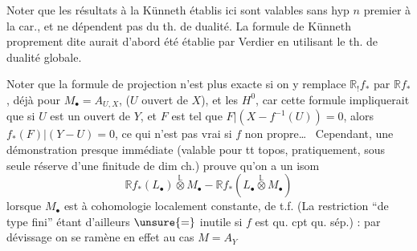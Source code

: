 Noter que les résultats à la Künneth établis ici
sont valables sans hyp $n$ premier à la car., et
ne dépendent pas du th. de dualité. La formule
de Künneth proprement dite aurait d'abord été
établie par Verdier  en utilisant le th. de dualité
globale.

Noter que la formule de projection n'est plus
exacte si on y remplace $\mathbb R_!f_*$ par $\mathbb Rf_*$, déjà pour
$M_\bullet=A_{U,X}$, 
($U$ ouvert de $X$), et les $H^0$, car
cette formule impliquerait que si $U$ est un ouvert
de $Y$, et $F$ est tel que $F\vert(X-f^{-1}(U))=0$, alors
$f_*(F)\vert(Y-U)=0$, ce qui n'est pas vrai si $f$
non propre\ldots\ 
Cependant, une démonstration
presque immédiate (valable pour tt topos, pratiquement,
sous seule réserve d'une finitude de dim ch.)
prouve qu'on a un isom
\[
\mathbb Rf_*(L_\bullet)\overset{\mathbb L}{\otimes}M_\bullet-
\mathbb Rf_*(L_\bullet\overset{\mathbb L}{\otimes}M_\bullet)
\]
lorsque $M_\bullet$ est à cohomologie localement
constante, de t.f. (La restriction ``de type fini''
étant d'ailleurs $\unsure{=}$ inutile si $f$ est
qu. cpt qu. sép.) : par dévissage on se ramène en
effet au cas $M=A_Y$ 

